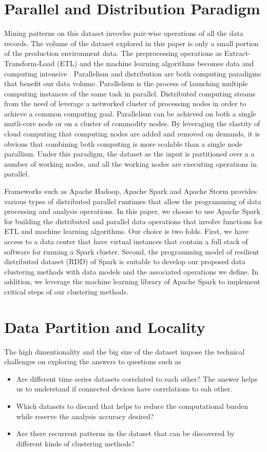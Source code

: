 \section{Parallel and Distribution Paradigm}
Mining patterns on this dataset invovles pair-wise operations of all the data records. The volume of the dataset explored in this paper is only a small portion of the production environment data. The preprocessing operations as Extract-Transform-Load (ETL) and the machine learning algorithms becomes data and computing intensive \cite{rusitschka2010smart}. Parallelism and distribution are both computing paradigms that benefit our data volume. Parallelism is the process of launching multiple computing instances of the same task in parallel. Distributed computing steams from the need of leverage a networked cluster of processing nodes in order to achieve a common computing goal. Parallelism can be achieved on both a single mutli-core node or on a cluster of commodity nodes. By leveraging the elastity of cloud computing that computing nodes are added and removed on demands, it is obvious that combining both computing is more scalable than a single node parallism.  Under this paradigm, the dataset as the input is partitioned over a a number of working nodes, and all the working nodes are executing operations in parallel. 

Frameworks such as Apache Hadoop, Apache Spark and Apache Storm  provides various types of distributed parallel runtimes that allow the programming of data processing and analysis operations. In this paper, we choose to use Apache Spark for building the distributed and parallel data operations that involve functions for ETL and machine learning algorithms. Our choice is two folds. First, we have access to a data center that have virtual instances that contain a full stack of software for running a Spark cluster. Second, the programming model of resilient distributed dataset (RDD) of Spark is suitable to develop our proposed data clustering methods with data models and the associated operations we define. In addition, we leverage the machine learning library of Apache Spark to implement critical steps of our clustering methods.  

\section{Data Partition and Locality}
The high dimentionality and the big size of the dataset impose the technical challenges on exploring the answers to questions such as 
\begin{itemize}
	\item Are different time series datasets correlated to each other? The answer helps us to understand if connected devices have correlations to eah other.
	\item Which datasets to discard that helps to reduce the computational burden while reserve the analysis accuracy desired?
	\item Are there recurrent patterns in the dataset that can be discovered by different kinds of clustering methods?
\end{itemize}

